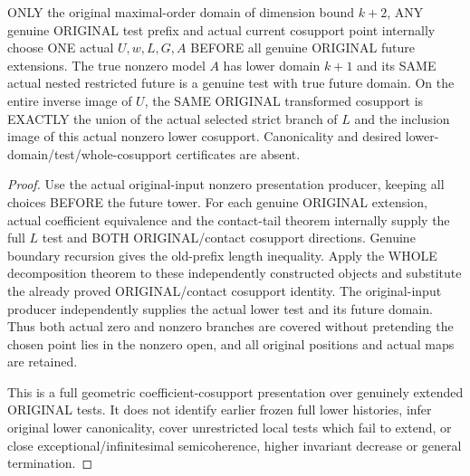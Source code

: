 \begin{theorem}
\label{hir:original-noncanonical-complete-contact-cosupport-presentation}
\leanok
ONLY the original maximal-order domain of dimension bound $k+2$, ANY
genuine ORIGINAL test prefix and actual current cosupport point internally
choose ONE actual $U,w,L,G,A$ BEFORE all genuine ORIGINAL future
extensions. The true nonzero model $A$ has lower domain $k+1$ and its
SAME actual nested restricted future is a genuine test with true future
domain. On the entire inverse image of $U$, the SAME ORIGINAL transformed
cosupport is EXACTLY the union of the actual selected strict branch of
$L$ and the inclusion image of this actual nonzero lower cosupport.
Canonicality and desired lower-domain/test/whole-cosupport certificates
are absent.
\end{theorem}
\begin{proof}
Use the actual original-input nonzero presentation producer, keeping all
choices BEFORE the future tower. For each genuine ORIGINAL extension,
actual coefficient equivalence and the contact-tail theorem internally
supply the full $L$ test and BOTH ORIGINAL/contact cosupport directions.
Genuine boundary recursion gives the old-prefix length inequality.
Apply the WHOLE decomposition theorem to these independently constructed
objects and substitute the already proved ORIGINAL/contact cosupport
identity. The original-input producer independently supplies the actual
lower test and its future domain. Thus both actual zero and nonzero
branches are covered without pretending the chosen point lies in the
nonzero open, and all original positions and actual maps are retained.

This is a full geometric coefficient-cosupport presentation over genuinely
extended ORIGINAL tests. It does not identify earlier frozen full lower
histories, infer original lower canonicality, cover unrestricted local
tests which fail to extend, or close exceptional/infinitesimal semicoherence,
higher invariant decrease or general termination.
\end{proof}
